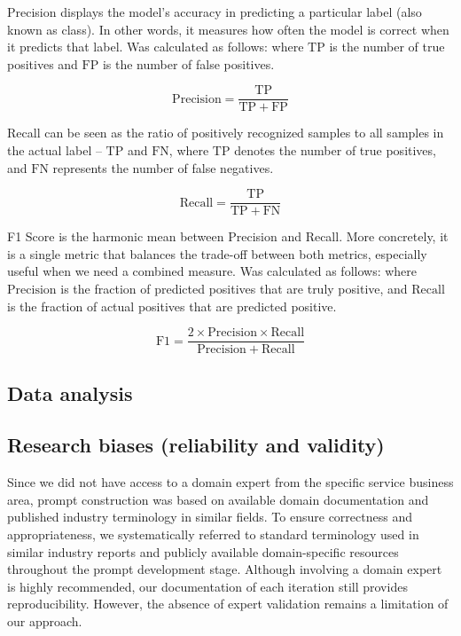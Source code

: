 \medskip
Precision displays the model’s accuracy in predicting a particular label (also known as class).  In other words, it measures how often the model is correct when it predicts that label.  Was calculated as follows: where $\mathrm{TP}$ is the number of true positives and $\mathrm{FP}$ is the  number of false positives.

$$
\mathrm{Precision} 
= \frac{\mathrm{TP}}{\mathrm{TP} + \mathrm{FP}}
$$

\medskip
Recall can be seen as the ratio of positively recognized samples to all samples  in the actual label -- $\mathrm{TP}$ and $\mathrm{FN}$, where $\mathrm{TP}$ denotes the number of true positives, and $\mathrm{FN}$ represents the number of false negatives.

$$
\mathrm{Recall} = \frac{\mathrm{TP}}{\mathrm{TP} + \mathrm{FN}}
$$

\medskip
F1 Score is the harmonic mean between Precision and Recall. More concretely, it is a single metric  that balances the trade-off between both metrics, especially useful when we need a combined measure.  Was calculated as follows: where $\mathrm{Precision}$ is the fraction of predicted positives that are  truly positive, and $\mathrm{Recall}$ is the fraction of actual positives that are predicted positive.

$$
\mathrm{F1} = \frac{2 \times \mathrm{Precision} \times \mathrm{Recall}}
{\mathrm{Precision} + \mathrm{Recall}}
$$


\subsection{Data analysis}
%

\subsection{Research biases (reliability and validity)}
%

Since we did not have access to a domain expert from the specific service business area, prompt construction was based on available domain documentation and published industry terminology in similar fields. To ensure correctness and appropriateness, we systematically referred to standard terminology used in similar industry reports and publicly available domain-specific resources throughout the prompt development stage. Although involving a domain expert is highly recommended, our documentation of each iteration still provides reproducibility. However, the absence of expert validation remains a limitation of our approach.